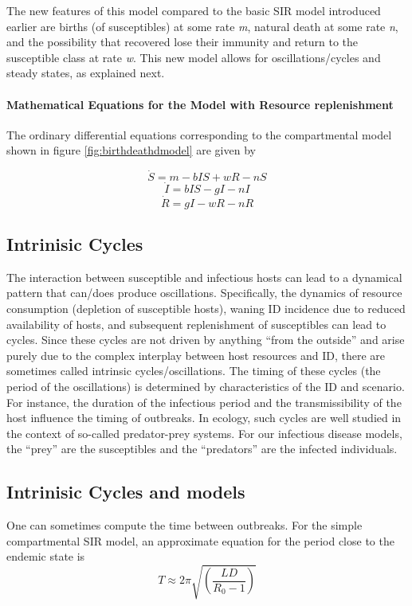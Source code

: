 \documentclass[]{article}
\let\oldparagraph\paragraph
\renewcommand{\paragraph}[1]{\oldparagraph{#1}\mbox{}}
\theoremstyle{definition}
\theoremstyle{definition}
\theoremstyle{definition}
\theoremstyle{remark}
\begin{document}
The new features of this model compared to the basic SIR model
introduced earlier are births (of susceptibles) at some rate \emph{m},
natural death at some rate \emph{n}, and the possibility that recovered
lose their immunity and return to the susceptible class at rate
\emph{w}. This new model allows for oscillations/cycles and steady
states, as explained next.

\paragraph{Mathematical Equations for the Model with Resource
replenishment}\label{myadvancedbox}

The ordinary differential equations corresponding to the compartmental
model shown in figure \ref{fig:birthdeathdmodel} are given by

\[\dot S = m - b I S + wR - n S \] \[\dot I = b IS - gI - n I \]
\[\dot R =  gI - wR - n R\]

\subsection{Intrinisic Cycles}\label{intrinisic-cycles}

The interaction between susceptible and infectious hosts can lead to a
dynamical pattern that can/does produce oscillations. Specifically, the
dynamics of resource consumption (depletion of susceptible hosts),
waning ID incidence due to reduced availability of hosts, and subsequent
replenishment of susceptibles can lead to cycles. Since these cycles are
not driven by anything ``from the outside'' and arise purely due to the
complex interplay between host resources and ID, there are sometimes
called intrinsic cycles/oscillations. The timing of these cycles (the
period of the oscillations) is determined by characteristics of the ID
and scenario. For instance, the duration of the infectious period and
the transmissibility of the host influence the timing of outbreaks. In
ecology, such cycles are well studied in the context of so-called
predator-prey systems. For our infectious disease models, the ``prey''
are the susceptibles and the ``predators'' are the infected individuals.

\subsection{Intrinisic Cycles and
models}\label{intrinisic-cycles-and-models}

One can sometimes compute the time between outbreaks. For the simple
compartmental SIR model, an approximate equation for the period close to
the endemic state is
\[T \approx 2 \pi \sqrt{\left( \frac{LD}{R_0 - 1} \right)}\]
\end{document}
